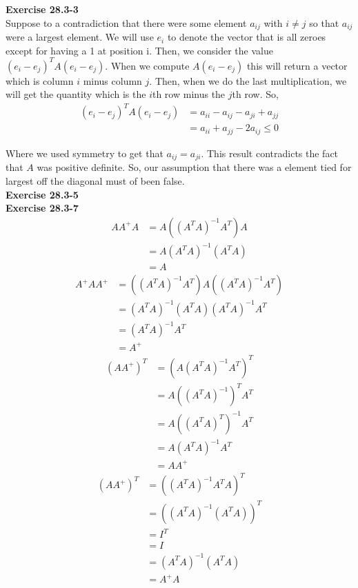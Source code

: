 \documentclass{article}
\begin{document}
\noindent\textbf{Exercise 28.3-3}\\
Suppose to a contradiction that there were some element $a_{ij}$ with $i\neq j$ so that $a_{ij}$ were a largest element. We will use $e_i$ to denote the vector that is all zeroes except for having a 1 at position i. Then, we consider the value $(e_i-e_j)^T A (e_i-e_j)$. When we compute $A(e_i-e_j)$ this will return a vector which is column $i$ minus column $j$. Then, when we do the last multiplication, we will get the quantity which is the $i$th row minus the $j$th row. So, 
\begin{align*}
(e_i-e_j)^T A (e_i-e_j) &= a_{ii} - a_{ij} - a_{ji}  +a_{jj}\\
&=a_{ii} + a_{jj} - 2 a_{ij}\le0
\end{align*}

Where we used symmetry to get that $a_{ij} =a_{ji}$. This result contradicts the fact that $A$ was positive definite. So, our assumption that there was a element tied for largest off the diagonal must of been false.\\

\noindent\textbf{Exercise 28.3-5}\\


\noindent\textbf{Exercise 28.3-7}\\

\begin{align*}
AA^+A &= A ((A^TA)^{-1}A^T)A\\
&= A(A^TA)^{-1}(A^T A)\\
&= A
\end{align*}
\begin{align*}
A^+AA^+ &=  ((A^TA)^{-1}A^T)A((A^TA)^{-1}A^T)\\
 &= (A^TA)^{-1} (A^T A)(A^TA)^{-1} A^T\\ 
 &= (A^TA)^{-1} A^T\\
 &= A^+
\end{align*}
\begin{align*}
(AA^+)^T &= (A (A^TA)^{-1}A^T)^T\\
&= A ((A^T A)^{-1})^T A^T\\
&= A((A^T A)^T)^{-1} A^T\\
&= A(A^T A)^{-1} A^T\\
&= A A^+
\end{align*}
\begin{align*}
(AA^+)^T &= ((A^TA)^{-1}A^T A)^T\\
&= ((A^T A)^{-1}(A^T A))^T \\
&= I^T\\
&= I\\
&= (A^T A)^{-1} (A^TA)\\
&= A^+ A
\end{align*}
\end{document}
